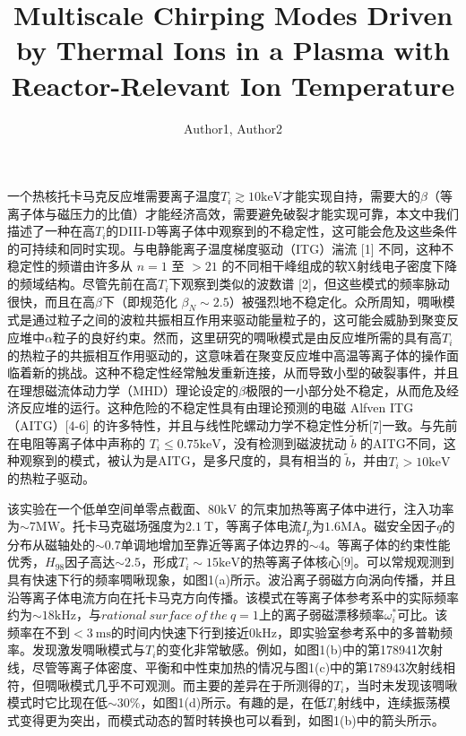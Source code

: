 \documentclass[oneside,onecolumn]{article}
\date{}
\title{Multiscale Chirping Modes Driven by Thermal Ions in a Plasma with Reactor-Relevant Ion Temperature}
\author{Author1, Author2}
\begin{document}
  \begin{sloppypar}
  \maketitle
 
 一个热核托卡马克反应堆需要离子温度$T_{i}\gtrsim10\mathrm{keV}$才能实现自持，需要大的$\beta$（等离子体与磁压力的比值）才能经济高效，需要避免破裂才能实现可靠，本文中我们描述了一种在高$T_{i}$的DIII-D等离子体中观察到的不稳定性，这可能会危及这些条件的可持续和同时实现。与电静能离子温度梯度驱动（ITG）湍流 [1] 不同，这种不稳定性的频谱由许多从 $n=1$ 至 $>21$ 的不同相干峰组成的软X射线电子密度下降的频域结构。尽管先前在高$T_{i}$下观察到类似的波数谱 [2]，但这些模式的频率脉动很快，而且在高$\beta$下（即规范化 $\beta_{N} \sim 2.5$）被强烈地不稳定化。众所周知，啁啾模式是通过粒子之间的波粒共振相互作用来驱动能量粒子的，这可能会威胁到聚变反应堆中$\alpha$粒子的良好约束。然而，这里研究的啁啾模式是由反应堆所需的具有高$T_{i}$的热粒子的共振相互作用驱动的，这意味着在聚变反应堆中高温等离子体的操作面临着新的挑战。这种不稳定性经常触发重新连接，从而导致小型的破裂事件，并且在理想磁流体动力学（MHD）理论设定的$\beta$极限的一小部分处不稳定，从而危及经济反应堆的运行。这种危险的不稳定性具有由理论预测的电磁 Alfven ITG（AITG）[4-6] 的许多特性，并且与线性陀螺动力学不稳定性分析[7]一致。与先前在电阻等离子体中声称的 $ T_{i}\leq 0.75\mathrm{keV}$，没有检测到磁波扰动 $\tilde{b}$ 的AITG不同，这种观察到的模式，被认为是AITG，是多尺度的，具有相当的 $\tilde{b}$，并由$T_{i}>10 \mathrm{keV}$的热粒子驱动。
  
 该实验在一个低单空间单零点截面、$80 \mathrm{kV}$ 的氘束加热等离子体中进行，注入功率为$\sim 7 \mathrm{MW}$。托卡马克磁场强度为$2.1 \mathrm{~T}$，等离子体电流$I_{p}$为$1.6 \mathrm{MA}$。磁安全因子$q$的分布从磁轴处的$\sim 0.7$单调地增加至靠近等离子体边界的$\sim 4$。等离子体的约束性能优秀，$H_{98}$因子高达$\sim 2.5$，形成$T_{i} \sim 15 \mathrm{keV}$的热等离子体核心[9]。可以常规观测到具有快速下行的频率啁啾现象，如图1(a)所示。波沿离子弱磁方向涡向传播，并且沿等离子体电流方向在托卡马克方向传播。该模式在等离子体参考系中的实际频率约为$\sim 18 \mathrm{kHz}$，与$rational~surface~of~the~q=1$上的离子弱磁漂移频率$\omega_{i}^{*}$可比。该频率在不到$<3 \mathrm{~ms}$的时间内快速下行到接近$0 \mathrm{kHz}$，即实验室参考系中的多普勒频率。发现激发啁啾模式与$T_{i}$的变化非常敏感。例如，如图1(b)中的第178941次射线，尽管等离子体密度、平衡和中性束加热的情况与图1(c)中的第178943次射线相符，但啁啾模式几乎不可观测。而主要的差异在于所测得的$T_{i}$，当时未发现该啁啾模式时它比现在低$\sim 30 \%$，如图1(d)所示。有趣的是，在低$T_{i}$射线中，连续振荡模式变得更为突出，而模式动态的暂时转换也可以看到，如图1(b)中的箭头所示。
  

\end{sloppypar}
\end{document}

